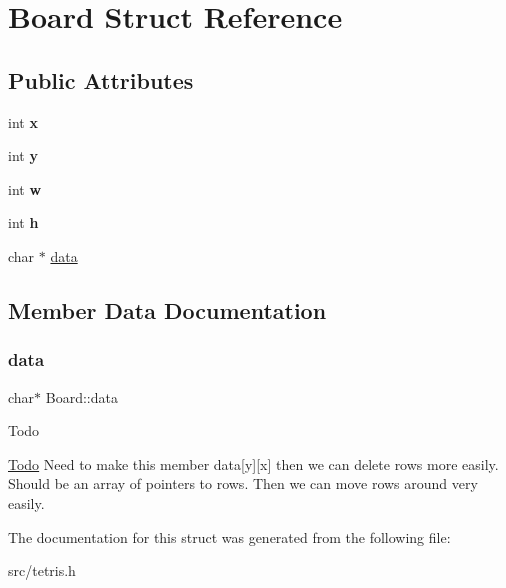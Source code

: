 \hypertarget{structBoard}{}\section{Board Struct Reference}
\label{structBoard}
\subsection*{Public Attributes}
\begin{DoxyCompactItemize}
\item 
\mbox{\label{structBoard_afccfde2bf33dce1e8049f143c75a8e5a}} 
int {\bfseries x}
\item 
\mbox{\label{structBoard_aed53ae7fac54d57d18338478e40f49a4}} 
int {\bfseries y}
\item 
\mbox{\label{structBoard_a8dc094aa30ce1bfc747617ab8c25e722}} 
int {\bfseries w}
\item 
\mbox{\label{structBoard_a82e506afe804a64aac9149b8833a5a78}} 
int {\bfseries h}
\item 
char $\ast$ \hyperlink{structBoard_ae1c9aa90b404ac7b06bd6fea2a865d16}{data}
\end{DoxyCompactItemize}


\subsection{Member Data Documentation}
\mbox{\label{structBoard_ae1c9aa90b404ac7b06bd6fea2a865d16}} 
\subsubsection{\texorpdfstring{data}{data}}
{\footnotesize\ttfamily char$\ast$ Board\+::data}

\begin{DoxyRefDesc}{Todo}
\item[\hyperlink{todo__todo000001}{Todo}]Need to make this member data\mbox{[}y\mbox{]}\mbox{[}x\mbox{]} then we can delete rows more easily. Should be an array of pointers to rows. Then we can move rows around very easily. \end{DoxyRefDesc}


The documentation for this struct was generated from the following file\+:\begin{DoxyCompactItemize}
\item 
src/tetris.\+h\end{DoxyCompactItemize}
